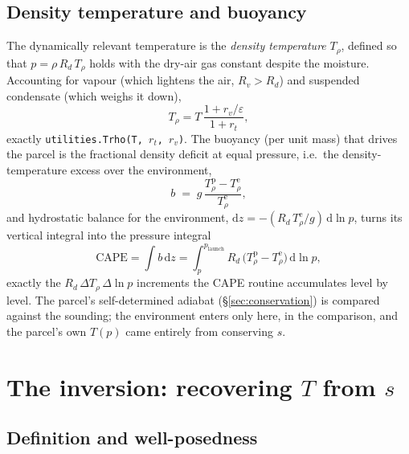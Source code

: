 \documentclass[11pt,a4paper]{article}
\theoremstyle{definition}
\newcommand{\Rd}{R_d}
\newcommand{\Rv}{R_v}
\newcommand{\rt}{r_t}
\newcommand{\rvv}{r_v}
\newcommand{\eps}{\varepsilon}
\newcommand{\dd}{\mathrm{d}}
\newcommand{\Trho}{T_\rho}
\begin{document}
\subsection{Density temperature and buoyancy}

The dynamically relevant temperature is the \emph{density temperature}
$\Trho$, defined so that $p=\rho\,\Rd\,\Trho$ holds with the dry-air gas
constant despite the moisture. Accounting for vapour (which lightens the air,
$\Rv>\Rd$) and suspended condensate (which weighs it down),
\begin{equation}\label{eq:trho}
\Trho=T\,\frac{1+\rvv/\eps}{1+\rt},
\end{equation}
exactly \texttt{utilities.Trho(T,\,$\rt$,\,$\rvv$)}. The buoyancy (per unit
mass) that drives the parcel is the fractional density deficit at equal
pressure, i.e.\ the density-temperature excess over the environment,
\begin{equation}\label{eq:buoy}
b \;=\; g\,\frac{\Trho^{\mathrm{p}}-\Trho^{\mathrm{e}}}{\Trho^{\mathrm{e}}},
\end{equation}
and hydrostatic balance for the environment,
$\dd z=-(\Rd\,\Trho^{\mathrm{e}}/g)\,\dd\ln p$, turns its vertical integral
into the pressure integral
\begin{equation}\label{eq:cape}
\mathrm{CAPE}
=\int b\,\dd z
=\int_{p}^{p_{\mathrm{launch}}}\Rd\,
 \big(\Trho^{\mathrm{p}}-\Trho^{\mathrm{e}}\big)\,\dd\ln p,
\end{equation}
exactly the $\Rd\,\Delta\Trho\,\Delta\ln p$ increments the CAPE routine
accumulates level by level. The parcel's self-determined adiabat
(\S\ref{sec:conservation}) is compared against the sounding; the environment
enters only here, in the comparison, and the parcel's own $T(p)$ came entirely
from conserving $s$.

\section{The inversion: recovering \texorpdfstring{$T$}{T} from \texorpdfstring{$s$}{s}}
\label{sec:inversion}

\subsection{Definition and well-posedness}
\end{document}
